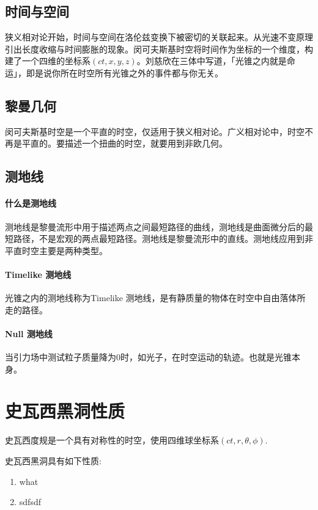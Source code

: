 \subsection{时间与空间}
狭义相对论开始，时间与空间在洛伦兹变换下被密切的关联起来。从光速不变原理引出长度收缩与时间膨胀的现象。闵可夫斯基时空将时间作为坐标的一个维度，构建了一个四维的坐标系$\left(ct,x,y,z\right)$。刘慈欣在三体中写道，「光锥之内就是命运」\cite{three-body}，即是说你所在时空所有光锥之外的事件都与你无关。

\subsection{黎曼几何}
闵可夫斯基时空是一个平直的时空，仅适用于狭义相对论。广义相对论中，时空不再是平直的。要描述一个扭曲的时空，就要用到非欧几何。

\subsection{测地线}
\paragraph{什么是测地线}
测地线是黎曼流形中用于描述两点之间最短路径的曲线，测地线是曲面微分后的最短路径，不是宏观的两点最短路径。测地线是黎曼流形中的直线。测地线应用到非平直时空主要是两种类型。
\paragraph{Timelike 测地线}
光锥之内的测地线称为Timelike 测地线，是有静质量的物体在时空中自由落体所走的路径。
\paragraph{Null 测地线}
当引力场中测试粒子质量降为0时，如光子，在时空运动的轨迹。也就是光锥本身。



\section{史瓦西黑洞性质}
史瓦西度规是一个具有对称性的时空，使用四维球坐标系$\left(ct,r,\theta,\phi\right)$.

史瓦西黑洞具有如下性质:
\begin{enumerate}
    
    \item what
    \item sdfsdf
\end{enumerate}


